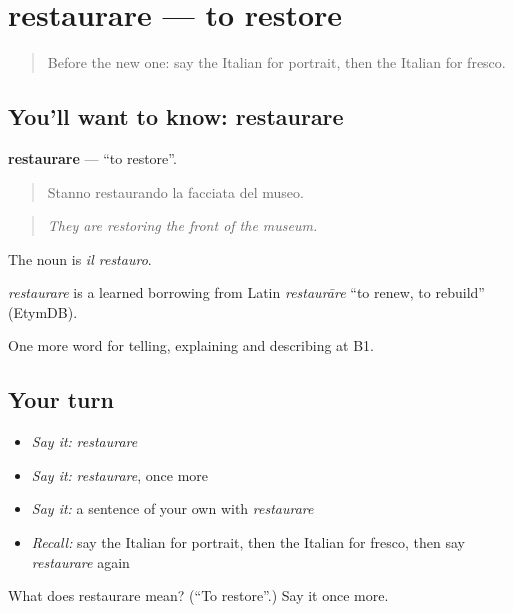\section[restaurare]{restaurare — to restore}

\label{lesson:IT-C523-restaurare}



\begin{quote}
Before the new one: say the Italian for portrait, then the Italian for fresco.
\end{quote}

\subsection*{You'll want to know: restaurare}
\textbf{restaurare} — \textquotedblleft{}to restore\textquotedblright{}.

\begin{quote}
Stanno restaurando la facciata del museo.
\end{quote}

\begin{quote}
\emph{They are restoring the front of the museum.}
\end{quote}

The noun is \emph{il restauro}.

\begin{cousinweb}
\emph{restaurare} is a learned borrowing from Latin \emph{restaurāre} \textquotedblleft{}to renew, to rebuild\textquotedblright{} (EtymDB).
\end{cousinweb}

\begin{grammarlens}[title={What you've built}]
One more word for telling, explaining and describing at B1.
\end{grammarlens}

\subsection*{Your turn}
\begin{itemize}
\raggedright
  \item \emph{Say it:} \emph{restaurare}
  \item \emph{Say it:} \emph{restaurare}, once more
  \item \emph{Say it:} a sentence of your own with \emph{restaurare}
  \item \emph{Recall:} say the Italian for portrait, then the Italian for fresco, then say \emph{restaurare} again
\end{itemize}

\begin{tcolorbox}[breakable,colback=teal!4,colframe=teal!35!black,title={Before you move on}]
What does restaurare mean? (\textquotedblleft{}To restore\textquotedblright{}.) Say it once more.
\end{tcolorbox}
